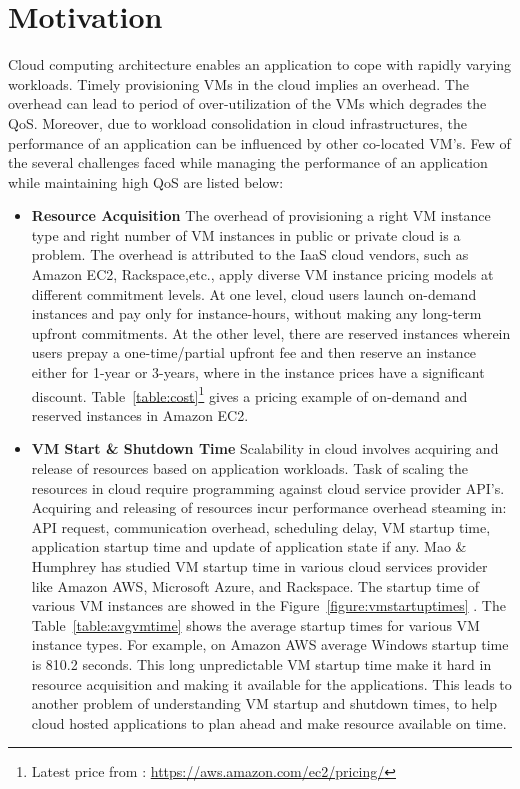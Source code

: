 \section{Motivation}
\label{sec:Motivation}
Cloud computing architecture enables an application to cope with rapidly varying workloads. Timely provisioning VMs in the cloud implies an overhead. The overhead can lead to period of over-utilization of the VMs which degrades the QoS. Moreover, due to workload consolidation in cloud infrastructures, the performance of an application can be influenced by other co-located VM's. Few of the several challenges faced while managing the performance of an application while maintaining high QoS are listed below:
\begin{itemize}
  \item \textbf{Resource Acquisition} The overhead of provisioning a right VM instance type and right number of VM instances in public or private cloud is a problem. The overhead is attributed to the IaaS cloud vendors, such as Amazon EC2\cite{amazon2010amazon}, Rackspace\cite{rackspace2010inc},etc., apply diverse VM instance pricing models at different commitment levels. At one level, cloud users launch on-demand instances and pay only for instance-hours, without making any long-term upfront commitments. At the other level, there are reserved instances wherein users prepay a one-time/partial upfront fee and then reserve an instance either for 1-year or 3-years, where in the instance prices have a significant discount. Table~\ref{table:cost}\footnote{Latest price from : \url{https://aws.amazon.com/ec2/pricing/}} gives a pricing example of on-demand and reserved instances in Amazon EC2.
  \item \textbf{VM Start \& Shutdown Time} Scalability in cloud involves acquiring and release of resources based on application workloads\cite{roy2011efficient}. Task of scaling the resources in cloud require programming against cloud service provider API's. Acquiring and releasing of resources incur performance overhead steaming in: API request, communication overhead, scheduling delay, VM startup time, application startup time and update of application state if any\cite{roy2011efficient}. Mao \& Humphrey\cite{mao2012performance} has studied VM startup time in various cloud services provider like Amazon AWS, Microsoft Azure, and Rackspace. The startup time of various VM instances are showed in the Figure~\ref{figure:vmstartuptimes} . The Table~\ref{table:avgvmtime} shows the average startup times for various VM instance types. For example, on Amazon AWS average Windows startup time is 810.2 seconds. This long unpredictable VM startup time make it hard in resource acquisition and making it available for the applications. This leads to another problem of understanding VM startup and shutdown times, to help cloud hosted applications to plan ahead and make resource available on time.

\end{itemize}
